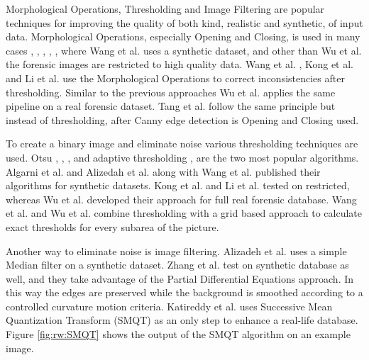 \documentclass[draft,final]{vutinfth} %
\begin{document}
\par
Morphological Operations, Thresholding and Image Filtering are popular techniques for improving the quality of both kind, realistic and synthetic, of input data.
Morphological Operations, especially Opening and Closing, is used in many cases \cite{wang2014automatic}, \cite{kong2014novel}, \cite{li2014retrieval}, \cite{tang2010footwear}, \cite{wu2019crime}, where Wang et al. \cite{wang2014automatic} uses a synthetic dataset, and other than Wu et al. \cite{wu2019crime} the forensic images are restricted to high quality data.
Wang et al. \cite{wang2014automatic}, Kong et al.  \cite{kong2014novel} and Li et al. \cite{li2014retrieval} use the Morphological Operations to correct inconsistencies after thresholding.
Similar to the previous approaches Wu et al. \cite{wu2019crime} applies the same pipeline on a real forensic dataset.
Tang et al. \cite{tang2010footwear} follow the same principle but instead of thresholding, after Canny edge detection is Opening and Closing used.
\par
To create a binary image and eliminate noise various thresholding techniques are used.
Otsu  \cite{wu2019crime}, \cite{algarni2008novel}, \cite{alizadeh2017automatic}, \cite{kong2014novel} and adaptive thresholding \cite{wang2014automatic}, \cite{li2014retrieval} are the two most popular algorithms.
Algarni et al. \cite{algarni2008novel} and Alizedah et al. \cite{alizadeh2017automatic} along with Wang et al. \cite{wang2014automatic} published their algorithms for synthetic datasets.
Kong et al. \cite{kong2014novel} and Li et al. \cite{li2014retrieval} tested on restricted, whereas Wu et al. \cite{wu2019crime} developed their approach for full real forensic database.
Wang et al. \cite{wang2014automatic} and Wu et al. \cite{wu2019crime} combine thresholding with a grid based approach to calculate exact thresholds for every subarea of the picture.
\par
Another way to eliminate noise is image filtering.
Alizadeh et al. \cite{alizadeh2017automatic} uses a simple Median filter on a synthetic dataset.
Zhang et al. \cite{zhang2005automatic} test on synthetic database as well, and they take advantage of the Partial Differential Equations approach.
In this way the edges are preserved while the background is smoothed according to a controlled curvature motion criteria. 
Katireddy et al. \cite{katireddy2017novel} uses Successive Mean Quantization Transform (SMQT) \cite{nilsson2013smqt} as an only step to enhance a real-life database.
Figure \ref{fig:rw:SMQT} shows the output of the SMQT algorithm on an example image.
\end{document}
